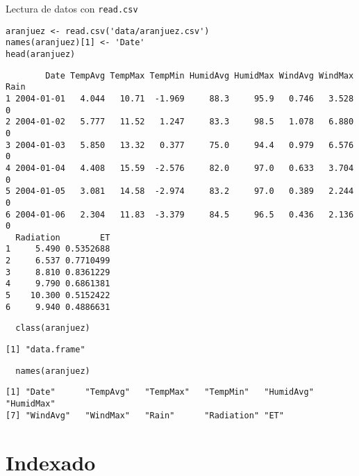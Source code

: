 \documentclass[xcolor={usenames,svgnames,dvipsnames}]{beamer}
\begin{document}
\begin{frame}[fragile,label=sec-1-3]{Lectura de datos con \texttt{read.csv}}
 \lstset{language=R,label= ,caption= ,numbers=none}
\begin{lstlisting}
aranjuez <- read.csv('data/aranjuez.csv')
names(aranjuez)[1] <- 'Date'
head(aranjuez)
\end{lstlisting}

\begin{verbatim}
        Date TempAvg TempMax TempMin HumidAvg HumidMax WindAvg WindMax Rain
1 2004-01-01   4.044   10.71  -1.969     88.3     95.9   0.746   3.528    0
2 2004-01-02   5.777   11.52   1.247     83.3     98.5   1.078   6.880    0
3 2004-01-03   5.850   13.32   0.377     75.0     94.4   0.979   6.576    0
4 2004-01-04   4.408   15.59  -2.576     82.0     97.0   0.633   3.704    0
5 2004-01-05   3.081   14.58  -2.974     83.2     97.0   0.389   2.244    0
6 2004-01-06   2.304   11.83  -3.379     84.5     96.5   0.436   2.136    0
  Radiation        ET
1     5.490 0.5352688
2     6.537 0.7710499
3     8.810 0.8361229
4     9.790 0.6861381
5    10.300 0.5152422
6     9.940 0.4886631
\end{verbatim}

\lstset{language=R,label= ,caption= ,numbers=none}
\begin{lstlisting}
  class(aranjuez)
\end{lstlisting}

\begin{verbatim}
[1] "data.frame"
\end{verbatim}

\lstset{language=R,label= ,caption= ,numbers=none}
\begin{lstlisting}
  names(aranjuez)
\end{lstlisting}

\begin{verbatim}
[1] "Date"      "TempAvg"   "TempMax"   "TempMin"   "HumidAvg"  "HumidMax" 
[7] "WindAvg"   "WindMax"   "Rain"      "Radiation" "ET"
\end{verbatim}
\end{frame}

\section{Indexado}
\label{sec-2}
\end{document}
